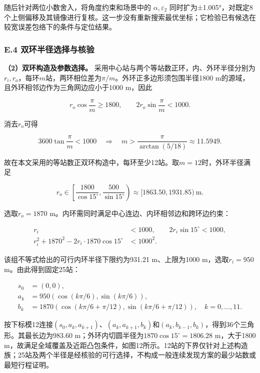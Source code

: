 \documentclass[UTF8,fontset=none,zihao=-4,a4paper]{ctexart}
\begin{document}
随后针对两位小数舍入，将角度约束和场景中的 \(\alpha,\varepsilon_2\) 同时扩为±1.005°，对既定8个上侧偏移及其镜像进行复核。这一步没有重新搜索最优坐标；它检验已有候选在较宽误差包络下的条件与定位结果。

\subsubsection{E.4 双环半径选择与核验}\label{e.4-ux53ccux73afux534aux5f84ux9009ux62e9ux4e0eux6838ux9a8c}

\textbf{（2）双环构造及参数选择。} 采用中心站与两个等站数正环，内、外环半径分别为\(r_i,r_o\)，每环\(m\)站，两环相位差为\(\pi/m\)。外环正多边形须包围半径1800 m的源域，且外环相邻边作为三角网边应小于1000 m，因此

\[
r_o\cos\frac{\pi}{m}\ge1800,
\qquad 2r_o\sin\frac{\pi}{m}<1000.
\]

消去\(r_o\)可得

\[
3600\tan\frac{\pi}{m}<1000
\quad\Longrightarrow\quad
m>\frac{\pi}{\arctan(5/18)}\approx11.5949.
\]

故在本文采用的等站数正双环构造中，每环至少12站。取\(m=12\)时，外环半径满足

\[
r_o\in\left[\frac{1800}{\cos15^\circ},
\frac{500}{\sin15^\circ}\right)
\approx[1863.50,1931.85)\ \mathrm m.
\]

选取\(r_o=1870\) m。内环需同时满足中心连边、内环相邻边和跨环边约束：

\[
\begin{aligned}
r_i&<1000,\qquad 2r_i\sin15^\circ<1000,\\
r_i^2+1870^2-2r_i\cdot1870\cos15^\circ&<1000^2.
\end{aligned}
\]

该组不等式给出的可行内环半径下限约为931.21 m、上限为1000 m，选取\(r_i=950\) m。由此得到固定25站：

\[
\begin{aligned}
s_0&=(0,0),\\
a_k&=950(\cos(k\pi/6),\sin(k\pi/6)),\\
b_k&=1870(\cos(k\pi/6+\pi/12),\sin(k\pi/6+\pi/12)),
\quad k=0,\ldots,11.
\end{aligned}
\]

按下标模12连接\((s_0,a_k,a_{k+1})\)、\((a_k,a_{k+1},b_k)\)和\((a_k,b_{k-1},b_k)\)，得到36个三角形。其最长边为983.60 m；外环内切圆半径为\(1870\cos15^\circ=1806.28\) m，大于1800 m，故满足全域覆盖及近距凸包条件，如图12所示。12站的下界仅针对上述构造族；25站及两个半径是经核验的可行选择，不构成一般连续发现方案的最少站数或最短行程证明。
\end{document}
